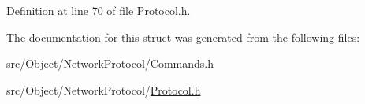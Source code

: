 Definition at line 70 of file Protocol.h.



The documentation for this struct was generated from the following files:\begin{DoxyCompactItemize}
\item 
src/Object/NetworkProtocol/\hyperlink{_commands_8h}{Commands.h}\item 
src/Object/NetworkProtocol/\hyperlink{_protocol_8h}{Protocol.h}\end{DoxyCompactItemize}
